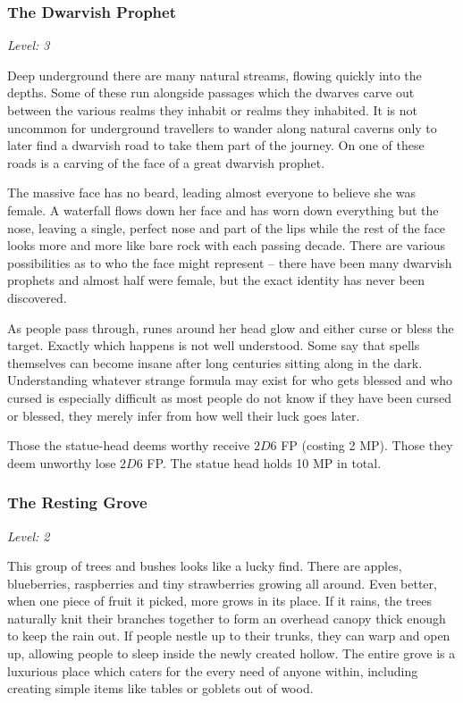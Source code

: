 \begin{multicols}{2}
\subsubsection{The Dwarvish Prophet}

\textit{Level: 3}

Deep underground there are many natural streams, flowing quickly into the depths.  Some of these run alongside passages which the dwarves carve out between the various realms they inhabit or realms they inhabited.  It is not uncommon for underground travellers to wander along natural caverns only to later find a dwarvish road to take them part of the journey.  On one of these roads is a carving of the face of a great dwarvish prophet.

The massive face has no beard, leading almost everyone to believe she was female.  A waterfall flows down her face and has worn down everything but the nose, leaving a single, perfect nose and part of the lips while the rest of the face looks more and more like bare rock with each passing decade.  There are various possibilities as to who the face might represent -- there have been many dwarvish prophets and almost half were female, but the exact identity has never been discovered.

As people pass through, runes around her head glow and either curse or bless the target.  Exactly which happens is not well understood.  Some say that spells themselves can become insane after long centuries sitting along in the dark.  Understanding whatever strange formula may exist for who gets blessed and who cursed is especially difficult as most people do not know if they have been cursed or blessed, they merely infer from how well their luck goes later.

Those the statue-head deems worthy receive $2D6$ FP (costing 2 MP).  Those they deem unworthy lose $2D6$ FP.  The statue head holds 10 MP in total.

\subsubsection{The Resting Grove}

\textit{Level: 2}

This group of trees and bushes looks like a lucky find.  There are apples, blueberries, raspberries and tiny strawberries growing all around.  Even better, when one piece of fruit it picked, more grows in its place.  If it rains, the trees naturally knit their branches together  to form an overhead canopy thick enough to keep the rain out.  If people nestle up to their trunks, they can warp and open up, allowing people to sleep inside the newly created hollow.  The entire grove is a luxurious place which caters for the every need of anyone within, including creating simple items like tables or goblets out of wood.


\end{multicols}
